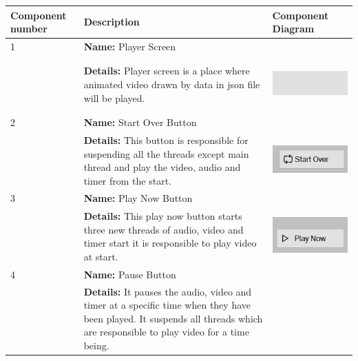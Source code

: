 \documentclass[12pt]{article}
\begin{document}
\begin{center}
 \begin{longtable}{|p{2cm}|p{7cm}|p{4cm}|} 
 \hline
 Component number & Description & Component Diagram \\ [0.5ex] 
 \hline
\hline 
1&\textbf{Name:} Player Screen\\&\textbf{Details:} Player screen is a place where animated video drawn by data in json file will be played.& \begin{minipage}{.3\textwidth}
      \includegraphics[width=\linewidth, height=20mm]{Player_Screen}
    \end{minipage}\\
\hline
 2 &
  \textbf{Name:} Start Over Button\\&
\textbf{Details:} This button is responsible for suspending all the threads except main thread and play the video, audio and timer from the start.& \begin{minipage}{.3\textwidth}
      \includegraphics[width=\linewidth, height=20mm]{Start_Over_Button}
    \end{minipage}\\
 \hline 3 &
  \textbf{Name:} Play Now Button\\&
\textbf{Details:} This play now button starts three new threads of audio, video and timer start it is responsible to play video at start.&\begin{minipage}{.3\textwidth}
      \includegraphics[width=\linewidth, height=20mm]{Play_Now_Button}
    \end{minipage}\\
 \hline 4 &
  \textbf{Name:} Pause Button\\&
\textbf{Details:} It pauses the audio, video and timer at a specific time when they have been played. It suspends all threads which are responsible to play video for a time being.& \begin{minipage}{.3\textwidth}

\end{minipage}
\end{longtable}
\end{center}
\end{document}
